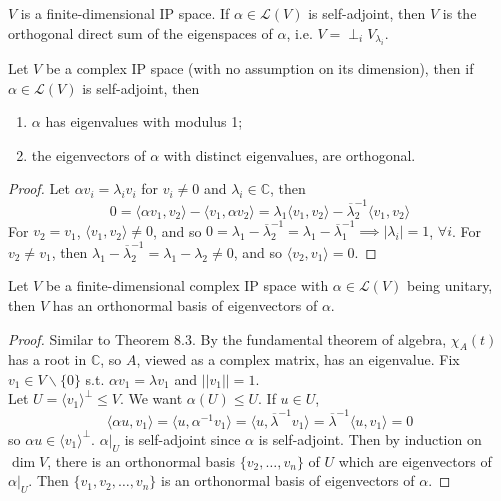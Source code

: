 \documentclass[a4paper]{article}
\begin{document}
\begin{cor}
$V$ is a finite-dimensional IP space. If $\alpha\in\mathcal{L}(V)$ is self-adjoint, then $V$ is the orthogonal direct sum of the eigenspaces of $\alpha$, i.e. $V=\perp_iV_{\lambda_i}$.
\end{cor}
\begin{lemma}
Let $V$ be a complex IP space (with no assumption on its dimension), then if $\alpha\in\mathcal{L}(V)$ is self-adjoint, then
\begin{enumerate}
    \item $\alpha$ has eigenvalues with modulus 1;
    \item the eigenvectors of $\alpha$ with distinct eigenvalues, are orthogonal.
\end{enumerate}
\end{lemma}
\begin{proof}
Let $\alpha v_i=\lambda_iv_i$ for $v_i\neq 0$ and $\lambda_i\in\mathbb{C}$, then
$$0=\langle\alpha v_1,v_2\rangle-\langle v_1,\alpha v_2\rangle=\lambda_1\langle v_1,v_2\rangle-\overline{\lambda}_2^{-1}\langle v_1,v_2\rangle$$
For $v_2=v_1$, $\langle v_1,v_2\rangle\neq 0$, and so $0=\lambda_1-\overline{\lambda}_2^{-1}=\lambda_1-\overline{\lambda}_1^{-1}\implies|\lambda_i|=1$,  $\forall i$. For $v_2\neq v_1$, then $\lambda_1-\overline{\lambda}_2^{-1}=\lambda_1-\lambda_2\neq 0$, and so $\langle v_2,v_1\rangle=0$.
\end{proof}
\begin{thm}
Let $V$ be a finite-dimensional complex IP space with $\alpha\in\mathcal{L}(V)$ being unitary, then $V$ has an orthonormal basis of eigenvectors of $\alpha$.
\end{thm}
\begin{proof}
Similar to Theorem 8.3. By the fundamental theorem of algebra, $\chi_A(t)$ has a root in $\mathbb{C}$, so $A$, viewed as a complex matrix, has an eigenvalue. Fix $v_1\in V\backslash\{0\}$ s.t. $\alpha v_1=\lambda v_1$ and $||v_1||=1$.\\[5pt]
Let $U=\langle v_1\rangle^\perp\leq V$. We want $\alpha(U)\leq U$. If $u\in U$, 
$$\langle\alpha u,v_1\rangle=\langle u,\alpha^{-1} v_1\rangle=\langle u,\overline{\lambda}^{-1} v_1\rangle=\overline{\lambda}^{-1}\langle u,v_1\rangle=0$$
so $\alpha u\in\langle v_1\rangle^\perp$.  $\alpha|_U$ is self-adjoint since $\alpha$ is self-adjoint. Then by induction on $\dim V$, there is an orthonormal basis $\{v_2,\dots,v_n\}$ of $U$ which are eigenvectors of $\alpha|_U$. Then $\{v_1,v_2,\dots,v_n\}$ is an orthonormal basis of eigenvectors of $\alpha$.
\end{proof}
\end{document}
